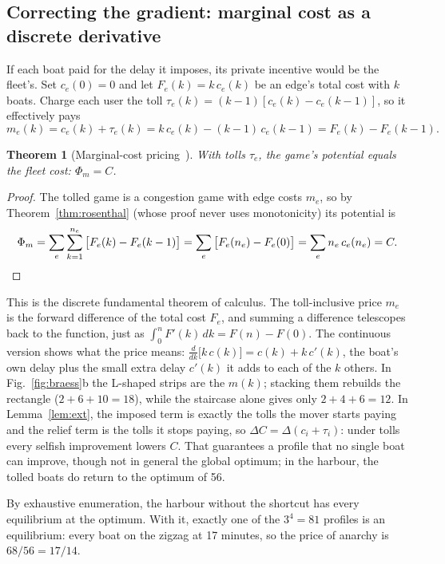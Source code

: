 \documentclass[11pt]{article}
\newtheorem{theorem}{Theorem}
\theoremstyle{definition}
\begin{document}
\subsection{Correcting the gradient: marginal cost as a discrete derivative}
If each boat paid for the delay it imposes, its private incentive would be the fleet's. Set $c_e(0)=0$ and let $F_e(k)=k\,c_e(k)$ be an edge's total cost with $k$ boats. Charge each user the toll $\tau_e(k)=(k-1)[c_e(k)-c_e(k-1)]$, so it effectively pays
\begin{equation}
m_e(k)=c_e(k)+\tau_e(k)=k\,c_e(k)-(k-1)\,c_e(k-1)=F_e(k)-F_e(k-1). \label{eq:m}
\end{equation}
\begin{theorem}[Marginal-cost pricing~\cite{roughgarden2002}]\label{thm:toll}
With tolls $\tau_e$, the game's potential equals the fleet cost: $\Phi_m=C$.
\end{theorem}
\begin{proof}
The tolled game is a congestion game with edge costs $m_e$, so by Theorem~\ref{thm:rosenthal} (whose proof never uses monotonicity) its potential is
\[
\Phi_m=\sum_e\sum_{k=1}^{n_e}\big[F_e(k)-F_e(k-1)\big]=\sum_e\big[F_e(n_e)-F_e(0)\big]=\sum_e n_e\,c_e(n_e)=C.\qedhere
\]
\end{proof}
This is the discrete fundamental theorem of calculus. The toll-inclusive price $m_e$ is the forward difference of the total cost $F_e$, and summing a difference telescopes back to the function, just as $\int_0^n F'(k)\,dk=F(n)-F(0)$. The continuous version shows what the price means: $\tfrac{d}{dk}\big[k\,c(k)\big]=c(k)+k\,c'(k)$, the boat's own delay plus the small extra delay $c'(k)$ it adds to each of the $k$ others. In Fig.~\ref{fig:braess}b the L-shaped strips are the $m(k)$; stacking them rebuilds the rectangle ($2+6+10=18$), while the staircase alone gives only $2+4+6=12$. In Lemma~\ref{lem:ext}, the imposed term is exactly the tolls the mover starts paying and the relief term is the tolls it stops paying, so $\Delta C=\Delta(c_i+\tau_i)$: under tolls every selfish improvement lowers $C$. That guarantees a profile that no single boat can improve, though not in general the global optimum; in the harbour, the tolled boats do return to the optimum of 56.

By exhaustive enumeration, the harbour without the shortcut has every equilibrium at the optimum. With it, exactly one of the $3^4=81$ profiles is an equilibrium: every boat on the zigzag at 17 minutes, so the price of anarchy is $68/56=17/14$.
\end{document}
